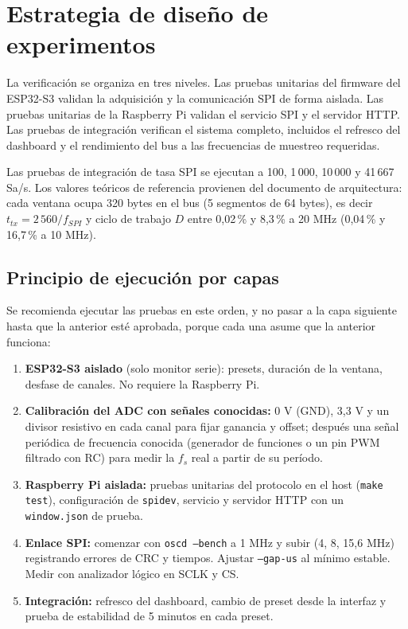 \documentclass[12pt,a4paper]{article}
\begin{document}

\tableofcontents
\newpage

\section{Estrategia de diseño de experimentos}

La verificación se organiza en tres niveles. Las pruebas unitarias del firmware del ESP32-S3 validan la adquisición y la comunicación SPI de forma aislada. Las pruebas unitarias de la Raspberry Pi validan el servicio SPI y el servidor HTTP. Las pruebas de integración verifican el sistema completo, incluidos el refresco del dashboard y el rendimiento del bus a las frecuencias de muestreo requeridas.

Las pruebas de integración de tasa SPI se ejecutan a 100, 1\,000, 10\,000 y 41\,667 Sa/s. Los valores teóricos de referencia provienen del documento de arquitectura: cada ventana ocupa 320 bytes en el bus (5 segmentos de 64 bytes), es decir $t_{tx} = 2\,560 / f_{SPI}$ y ciclo de trabajo $D$ entre 0{,}02\,\% y 8{,}3\,\% a 20 MHz (0{,}04\,\% y 16{,}7\,\% a 10 MHz).

\subsection{Principio de ejecución por capas}

Se recomienda ejecutar las pruebas en este orden, y no pasar a la capa siguiente hasta que la anterior esté aprobada, porque cada una asume que la anterior funciona:

\begin{enumerate}
  \item \textbf{ESP32-S3 aislado} (solo monitor serie): presets, duración de la ventana, desfase de canales. No requiere la Raspberry Pi.
  \item \textbf{Calibración del ADC con señales conocidas:} 0 V (GND), 3{,}3 V y un divisor resistivo en cada canal para fijar ganancia y offset; después una señal periódica de frecuencia conocida (generador de funciones o un pin PWM filtrado con RC) para medir la $f_s$ real a partir de su período.
  \item \textbf{Raspberry Pi aislada:} pruebas unitarias del protocolo en el host (\texttt{make test}), configuración de \texttt{spidev}, servicio y servidor HTTP con un \texttt{window.json} de prueba.
  \item \textbf{Enlace SPI:} comenzar con \texttt{oscd --bench} a 1 MHz y subir (4, 8, 15{,}6 MHz) registrando errores de CRC y tiempos. Ajustar \texttt{--gap-us} al mínimo estable. Medir con analizador lógico en SCLK y CS.
  \item \textbf{Integración:} refresco del dashboard, cambio de preset desde la interfaz y prueba de estabilidad de 5 minutos en cada preset.
\end{enumerate}
\end{document}
